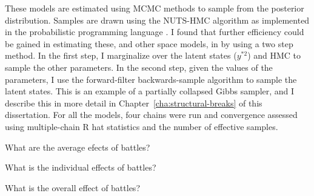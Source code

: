 These models are estimated using MCMC methods to sample from the posterior distribution.
Samples are drawn using the NUTS-HMC algorithm as implemented in the probabilistic programming language \Stan{} \parencites{Stan2015a}.
I found that further efficiency could be gained in estimating these, and other space models, in \Stan{} by using a two step method.
In the first step, I marginalize over the latent states ($y^{*2}$) and HMC to sample the other parameters.
In the second step, given the values of the parameters, I use the forward-filter backwards-sample algorithm to sample the latent states.
This is an example of a partially collapsed Gibbs sampler, and I describe this in more detail in Chapter~\ref{cha:structural-breaks} of this dissertation.
For all the models, four chains were run and convergence assessed using multiple-chain R hat statistics and the number of effective samples.


What are the average efects of battles?

What is the individual effects of battles?

What is the overall effect of battles?


